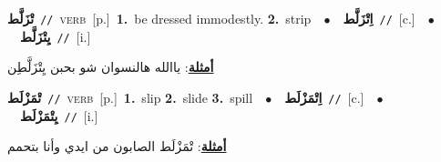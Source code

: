 \documentclass[10pt,a4paper,twoside]{article} %
\begin{document}
\begin{multicols}{2}
{\setlength\topsep{0pt}\textbf{\foreignlanguage{arabic}{تْزَلَّط}}\ {\color{gray}\texttt{//}\color{black}}\ \textsc{verb}\ [p.]\ \textbf{1.}~be dressed immodestly.  \textbf{2.}~strip\ \ $\bullet$\ \ \setlength\topsep{0pt}\textbf{\foreignlanguage{arabic}{اِتْزَلَّط}}\ {\color{gray}\texttt{//}\color{black}}\ [c.]\ \ $\bullet$\ \ \setlength\topsep{0pt}\textbf{\foreignlanguage{arabic}{يِتْزَلَّط}}\ {\color{gray}\texttt{//}\color{black}}\ [i.]\  \begin{flushright}\color{gray}\foreignlanguage{arabic}{\textbf{\underline{\foreignlanguage{arabic}{أمثلة}}}: ياالله هالنسوان شو بحبن يِتْزَلَّطِن}\end{flushright}\color{black}} \vspace{2mm}

{\setlength\topsep{0pt}\textbf{\foreignlanguage{arabic}{تْمَزْلَط}}\ {\color{gray}\texttt{//}\color{black}}\ \textsc{verb}\ [p.]\ \textbf{1.}~slip  \textbf{2.}~slide  \textbf{3.}~spill\ \ $\bullet$\ \ \setlength\topsep{0pt}\textbf{\foreignlanguage{arabic}{اِتْمَزْلَط}}\ {\color{gray}\texttt{//}\color{black}}\ [c.]\ \ $\bullet$\ \ \setlength\topsep{0pt}\textbf{\foreignlanguage{arabic}{يِتْمَزْلَط}}\ {\color{gray}\texttt{//}\color{black}}\ [i.]\  \begin{flushright}\color{gray}\foreignlanguage{arabic}{\textbf{\underline{\foreignlanguage{arabic}{أمثلة}}}: تْمَزْلَط الصابون من ايدي وأنا بتحمم}\end{flushright}\color{black}} \vspace{2mm}


\end{multicols}
\end{document}
